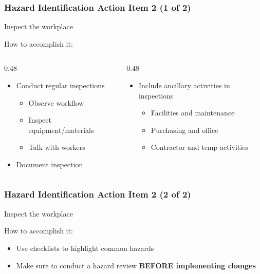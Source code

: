 \begin{frame}
	\frametitle{Hazard Identification Action Item 2 (1 of 2)}
    
    Inspect the workplace

    \begin{block}{How to accomplish it:}
        \vspace{-1.5em}
        \begin{columns}[t]
            \begin{column}{0.48\linewidth}
                \begin{itemize}
                    \item Conduct regular inspections
                    \begin{itemize}
                        \item Observe workflow
                        \item Inspect equipment/materials
                        \item Talk with workers
                    \end{itemize}
                    \item Document inspection
                \end{itemize}
            \end{column}
            \begin{column}{0.48\linewidth}
                    \begin{itemize}[<+- | alert@+>]
                        \item Include ancillary activities in inspections
                        \begin{itemize}
                            \item Facilities and maintenance
                            \item Purchasing and office
                            \item Contractor and temp activities
                        \end{itemize}
                    \end{itemize}
            \end{column}        
        \end{columns}
    \end{block}
\end{frame}

\begin{frame}
	\frametitle{Hazard Identification Action Item 2 (2 of 2)}
    
    Inspect the workplace

    \begin{block}{How to accomplish it:}
        \begin{itemize}[<+- | alert@+>]
            \item Use checklists to highlight common hazards
            \item Make sure to conduct a hazard review \textbf{BEFORE implementing changes}
        \end{itemize}
    \end{block}
\end{frame}

